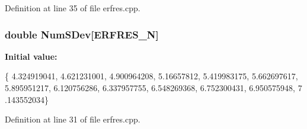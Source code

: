 Definition at line 35 of file erfres.\-cpp.

\subsubsection[{Num\-S\-Dev}]{\setlength{\rightskip}{0pt plus 5cm}double Num\-S\-Dev[{\bf E\-R\-F\-R\-E\-S\-\_\-\-N}]}\label{toolboxes_2rnd_2erfres_8cpp_a29461f93b72e58f78d8347360167bb79}
{\bfseries Initial value\-:}
\begin{DoxyCode}
 \{
   4.324919041, 4.621231001, 4.900964208, 5.16657812, 5.419983175, 5.662697617,
       5.895951217, 6.120756286, 6.337957755, 6.548269368, 6.752300431, 6.950575948, 7
      .143552034\}
\end{DoxyCode}


Definition at line 31 of file erfres.\-cpp.

